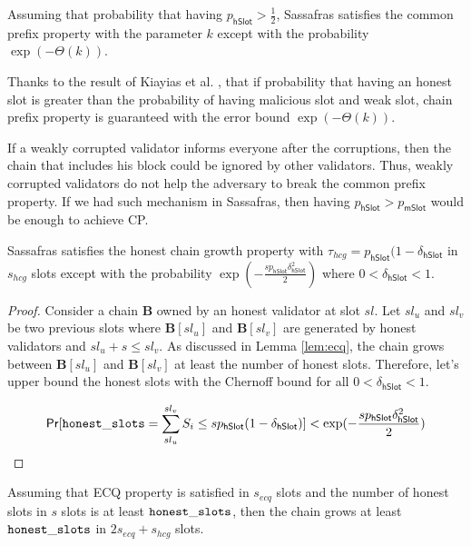 \begin{lemma}[CP]
	Assuming that probability that having  $ p_{\mathsf{hSlot}} >\frac{1}{2}$, Sassafras satisfies the common prefix property  with the parameter $ k $ except with the probability  $ \exp(-\Theta(k)) $. 
\end{lemma}

Thanks to the result of  Kiayias et al. \cite{consistency}, that if probability that having an honest slot is greater than the probability of having malicious slot and weak slot, chain prefix property is guaranteed with the error bound $ \exp(-\Theta(k)) $.

If a weakly corrupted validator informs everyone after the corruptions, then the chain that includes his block could be ignored by other validators. Thus, weakly corrupted validators do not help the adversary to break the common prefix property. If we had such mechanism in Sassafras, then having $ p_{\mathsf{hSlot}}  > p_{\mathsf{mSlot}} $ would be enough to achieve CP. 


\begin{lemma}[HCG]
	Sassafras satisfies the honest chain growth property with $ \tau_{hcg} = p_{\mathsf{hSlot}}(1-\delta_{\mathsf{hSlot}}  $ in $ s_{hcg} $ slots except with the probability $ \exp(-\frac{sp_{\mathsf{hSlot}}\delta_{\mathsf{hSlot}}^2}{2}) $ where $ 0< \delta_{\mathsf{hSlot}} < 1 $.
\end{lemma}

\begin{proof}
	Consider a chain $ \mathbf{B} $ owned by an honest validator at slot $ sl $. Let $ sl_u $ and $ sl_v $ be two previous slots where $ \mathbf{B}[sl_u] $ and $ \mathbf{B}[sl_v] $ are generated by honest validators and $ sl_u + s \leq sl_v $. As discussed in  Lemma \ref{lem:ecq}, the chain grows between $ \mathbf{B}[sl_u] $ and $ \mathbf{B}[sl_v] $ at least the number of honest slots. Therefore, let's upper bound the honest slots with the Chernoff bound for all $ 0<\delta_{\mathsf{hSlot}}<1 $.
	
	\begin{equation}
	\mathsf{Pr}[\mathtt{honest\_slots} = \sum_{sl_u}^{sl_v}S_i \leq s p_{\mathsf{hSlot}}(1-\delta_{\mathsf{hSlot}})] < \exp(-\frac{sp_{\mathsf{hSlot}}\delta_{\mathsf{hSlot}}^2}{2})
	\end{equation}
	
	
\end{proof}


\begin{lemma}[CG]
	Assuming that ECQ property is satisfied in $ s_{ecq} $ slots and the number of honest slots in $ s $ slots is at least $ \mathtt{honest\_slots} $, then the chain grows at least $ \mathtt{honest\_slots} $ in $ 2s_{ecq} + s_{hcg} $ slots.
\end{lemma}

